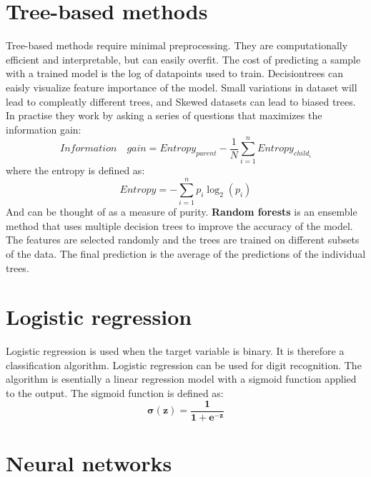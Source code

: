 \section{Tree-based methods}
Tree-based methods require minimal preprocessing. They are computationally efficient and interpretable, but can easily overfit. The cost of predicting a sample with a trained model is the log of datapoints used to train. 
Decisiontrees can eaisly visualize feature importance of the model. Small variations in dataset will lead to compleatly different trees, and Skewed datasets can lead to biased trees. \newline
In practise they work by asking a series of questions that maximizes the information gain:
\begin{equation}
    Information \quad gain = Entropy_{parent} - \frac{1}{N}\sum_{i=1}^{n} Entropy_{child_i}
\end{equation}
where the entropy is defined as:
\begin{equation}
    Entropy = -\sum_{i=1}^{n} p_i \log_2(p_i)
\end{equation}
And can be thought of as a measure of purity. \textbf{Random forests} is an ensemble method that uses multiple decision trees to improve the accuracy of the model. \newline
The features are selected randomly and the trees are trained on different subsets of the data. The final prediction is the average of the predictions of the individual trees.


\section{Logistic regression}
Logistic regression is used when the target variable is binary. It is therefore a classification algorithm.
Logistic regression can be used for digit recognition. The algorithm is esentially a linear regression model with a sigmoid function applied to the output. The sigmoid function is defined as:
\begin{equation}
    \mathbf{
    \sigma(z) = \frac{1}{1+e^{-z}}
    }
\end{equation}

\section{Neural networks}















